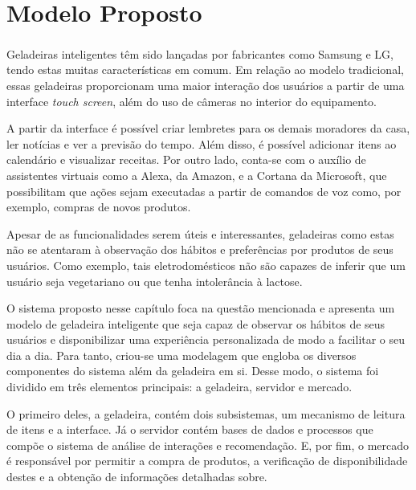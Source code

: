 \chapter{Modelo Proposto}
\label{cap:sistema_proposto}


Geladeiras inteligentes têm sido lançadas por fabricantes como Samsung\textsuperscript{\textregistered} e LG\textsuperscript{\textregistered}, tendo estas muitas características em comum. Em relação ao modelo tradicional, essas geladeiras proporcionam uma maior interação dos usuários a partir de uma interface \textit{touch screen}, além do uso de câmeras no interior do equipamento.

A partir da interface é possível criar lembretes para os demais moradores da casa, ler notícias e ver a previsão do tempo. Além disso, é possível adicionar itens ao calendário e visualizar receitas. Por outro lado, conta-se com o auxílio de assistentes virtuais como a Alexa, da Amazon, e a Cortana da Microsoft, que possibilitam que ações sejam executadas a partir de comandos de voz como, por exemplo, compras de novos produtos. 

Apesar de as funcionalidades serem úteis e interessantes, geladeiras como estas não se atentaram à observação dos hábitos e preferências por produtos de seus usuários. Como exemplo, tais eletrodomésticos não são capazes de inferir que um usuário seja vegetariano ou que tenha intolerância à lactose.

    


O sistema proposto nesse capítulo foca na questão mencionada e apresenta um modelo de geladeira inteligente que seja capaz de observar os hábitos de seus usuários e disponibilizar uma experiência personalizada de modo a facilitar o seu dia a dia. Para tanto, criou-se uma modelagem que engloba os diversos componentes do sistema além da geladeira em si. Desse modo, o sistema foi dividido em três elementos principais: a geladeira, servidor e mercado.

O primeiro deles, a geladeira, contém dois subsistemas, um mecanismo de leitura de itens e a interface. Já o servidor contém bases de dados e processos que compõe o sistema de análise de interações e recomendação. E, por fim, o mercado é responsável por permitir a compra de produtos, a verificação de disponibilidade destes e a obtenção de informações detalhadas sobre.
    
